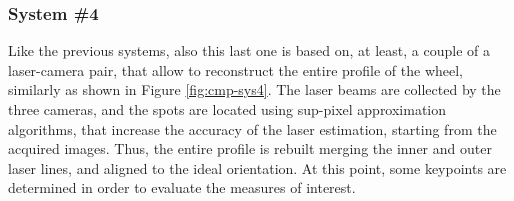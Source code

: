 \subsubsection{System \#4} %
Like the previous systems, also this last one is based on, at least, a couple of a laser-camera pair, that allow to reconstruct the entire profile of the wheel, similarly as shown in Figure \ref{fig:cmp-sys4}.
The laser beams are collected by the three cameras, and the spots are located using sup-pixel approximation algorithms, that increase the accuracy of the laser estimation, starting from the acquired images. Thus, the entire profile is rebuilt merging the inner and outer laser lines, and aligned to the ideal orientation. At this point, some keypoints are determined in order to evaluate the measures of interest. \\


